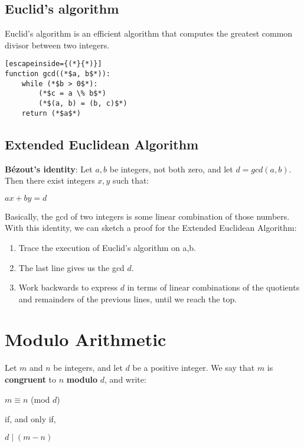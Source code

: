 \documentclass[a4paper]{article}
\begin{document}
\subsection{Euclid's algorithm}
Euclid's algorithm is an efficient algorithm that computes the greatest common divisor between two integers.
\begin{lstlisting}[escapeinside={(*}{*)}]
function gcd((*$a, b$*)):
	while (*$b > 0$*):
		(*$c = a \% b$*)
		(*$(a, b) = (b, c)$*)
	return (*$a$*)
\end{lstlisting}
\subsection{Extended Euclidean Algorithm}
\textbf{Bézout's identity}: Let $a, b$ be integers, not both zero, and let $d=gcd(a,b)$. Then there exist integers $x,y$ such that:
\begin{center}
	$ax+by=d$
\end{center}
Basically, the gcd of two integers is some linear combination of those numbers.\\
With this identity, we can sketch a proof for the Extended Euclidean Algorithm:
\begin{enumerate}
	\item Trace the execution of Euclid's algorithm on a,b.
	\item The last line gives us the gcd $d$.
	\item Work backwards to express $d$ in terms of linear combinations of the quotients and remainders of the previous lines, until we reach the top.
\end{enumerate}

\section{Modulo Arithmetic}
Let $m$ and $n$ be integers, and let $d$ be a positive integer. We say that $m$ is \textbf{congruent} to $n$ \textbf{modulo} $d$, and write:
\begin{center}
	$m\equiv n$  (mod $d$)
\end{center}
if, and only if,
\begin{center}
	$d\mid (m - n)$
\end{center}
\end{document}
